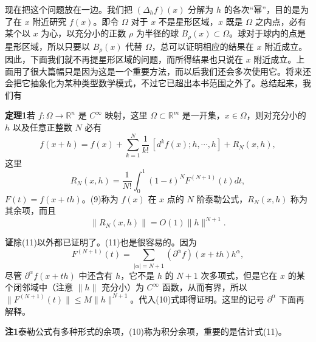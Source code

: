 现在把这个问题放在一边。我们把 $(\Delta_hf)(x)$ 分解为 $h$ 的各次“幂”，目的是为了在 $x$ 附近研究 $f(x)$。即令 $\Omega$ 对于 $x$ 不是星形区域，$x$ 既是 $\Omega$ 之内点，必有某个以 $x$ 为心，以充分小的正数 $\rho$ 为半径的球 $B_\rho(x)\subset\Omega$。球对于球内的点是星形区域，所以只要以 $B_\rho(x)$ 代替 $\Omega$，总可以证明相应的结果在 $x$ 附近成立。因此，下面我们就不再提星形区域的问题，而所得结果也只说在 $x$ 附近成立。上面用了很大篇幅只是因为这是一个重要方法，而以后我们还会多次使用它。将来还会把它抽象化为某种类型数学模式，不过它已超出本书范围之外了。总结起来，我们有

\noindent\textbf{定理1}\quad 若 $f:\Omega\to\mathbb R^n$ 是 $C^\infty$ 映射，这里 $\Omega\subset\mathbb R^m$ 是一开集，$x\in\Omega$，则对充分小的 $h$ 以及任意正整数 $N$ 必有
\begin{equation}
 f(x+h)=f(x)+\sum_{k=1}^N\frac1{k!}\,[d^kf(x);h,\cdots,h]+R_N(x,h),
 \tag{9}
\end{equation}
这里
\begin{equation}
 R_N(x,h)=\frac1{N!}\int_0^1(1-t)^N F^{(N+1)}(t)dt,
 \tag{10}
\end{equation}
$F(t)=f(x+th)$。(9)称为 $f(x)$ 在 $x$ 点的 $N$ 阶泰勒公式，$R_N(x,h)$ 称为其余项，而且
\begin{equation}
 \lVert R_N(x,h)\rVert=O(1)\lVert h\rVert^{N+1}.
 \tag{11}
\end{equation}

\noindent\textbf{证}\quad 除(11)以外都已证明了。(11)也是很容易的。因为
\[
 F^{(N+1)}(t)=\sum_{|\alpha|=N+1}(\partial^\alpha f)(x+th)h^\alpha,
\]
尽管 $\partial^\alpha f(x+th)$ 中还含有 $h$，它不是 $h$ 的 $N+1$ 次多项式，但是它在 $x$ 的某个闭邻域中（注意 $\lVert h\rVert$ 充分小）为 $C^\infty$ 函数，从而有界，所以 $\lVert F^{(N+1)}(t)\rVert\le M\lVert h\rVert^{N+1}$。代入(10)式即得证明。这里的记号 $\partial^\alpha$ 下面再解释。

\noindent\textbf{注1}\quad 泰勒公式有多种形式的余项，(10)称为积分余项，重要的是估计式(11)。

